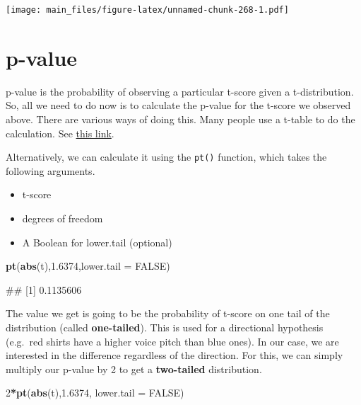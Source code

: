 \documentclass[
]{book}
\newenvironment{Shaded}{\begin{snugshade}}{\end{snugshade}}
\newcommand{\AttributeTok}[1]{\textcolor[rgb]{0.13,0.29,0.53}{#1}}
\newcommand{\ConstantTok}[1]{\textcolor[rgb]{0.56,0.35,0.01}{#1}}
\newcommand{\DecValTok}[1]{\textcolor[rgb]{0.00,0.00,0.81}{#1}}
\newcommand{\FloatTok}[1]{\textcolor[rgb]{0.00,0.00,0.81}{#1}}
\newcommand{\FunctionTok}[1]{\textcolor[rgb]{0.13,0.29,0.53}{\textbf{#1}}}
\newcommand{\NormalTok}[1]{#1}
\newcommand{\SpecialCharTok}[1]{\textcolor[rgb]{0.81,0.36,0.00}{\textbf{#1}}}
\providecommand{\tightlist}{%
  \setlength{\itemsep}{0pt}\setlength{\parskip}{0pt}}
\begin{document}
\texttt{[image: main\_files/figure-latex/unnamed-chunk-268-1.pdf]}

\hypertarget{p-value}{%
\section{p-value}\label{p-value}}

p-value is the probability of observing a particular t-score given a t-distribution. So, all we need to do now is to calculate the p-value for the t-score we observed above. There are various ways of doing this. Many people use a t-table to do the calculation. See \href{https://www.sjsu.edu/faculty/gerstman/StatPrimer/t-table.pdf}{this link}.

Alternatively, we can calculate it using the \texttt{pt()} function, which takes the following arguments.

\begin{itemize}
\tightlist
\item
  t-score
\item
  degrees of freedom
\item
  A Boolean for lower.tail (optional)
\end{itemize}

\begin{Shaded}
\begin{Highlighting}[]
\FunctionTok{pt}\NormalTok{(}\FunctionTok{abs}\NormalTok{(t),}\FloatTok{1.6374}\NormalTok{,}\AttributeTok{lower.tail =} \ConstantTok{FALSE}\NormalTok{)}
\end{Highlighting}
\end{Shaded}

\begin{Shaded}
\begin{Highlighting}[]
\NormalTok{\#\# [1] 0.1135606}
\end{Highlighting}
\end{Shaded}

The value we get is going to be the probability of t-score on one tail of the distribution (called \textbf{one-tailed}). This is used for a directional hypothesis (e.g.~red shirts have a higher voice pitch than blue ones). In our case, we are interested in the difference regardless of the direction. For this, we can simply multiply our p-value by 2 to get a \textbf{two-tailed} distribution.

\begin{Shaded}
\begin{Highlighting}[]
\DecValTok{2}\SpecialCharTok{*}\FunctionTok{pt}\NormalTok{(}\FunctionTok{abs}\NormalTok{(t),}\FloatTok{1.6374}\NormalTok{, }\AttributeTok{lower.tail =} \ConstantTok{FALSE}\NormalTok{)}
\end{Highlighting}
\end{Shaded}
\end{document}
